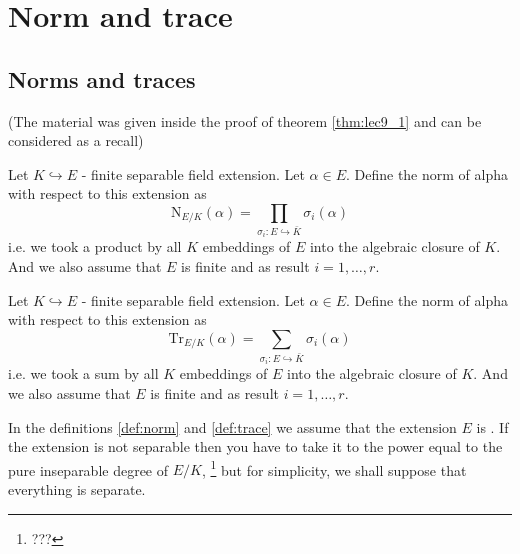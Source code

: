 \section{Norm and trace}

\subsection{Norms and traces}
(The material was given inside the proof of theorem \ref{thm:lec9_1}
and can be considered as a recall)
\begin{definition}[Norm]
  Let $K \hookrightarrow E$ - finite separable field extension. Let $\alpha \in
  E$.   Define the norm of alpha with respect to this extension as
  \[
  \mathrm {N}_{E/K}\left(\alpha\right) =
  \prod_{\sigma_i: E \hookrightarrow \bar{K}} \sigma_i\left(\alpha\right)
  \]
  i.e. we took a product by all $K$ embeddings of $E$ into the
  algebraic closure of $K$. And we also assume that $E$ is
  finite and as result $i = 1, \dots, r$.
  \label{def:norm}
\end{definition}

\begin{definition}[Trace]
  Let $K \hookrightarrow E$ - finite separable field extension. Let $\alpha \in
  E$.   Define the norm of alpha with respect to this extension as
  \[
  \mathrm {Tr}_{E/K}\left(\alpha\right) =
  \sum_{\sigma_i: E \hookrightarrow \bar{K}} \sigma_i\left(\alpha\right)
  \]
  i.e. we took a sum by all $K$ embeddings of $E$ into the
  algebraic closure of $K$. And we also assume that $E$ is
  finite and as result $i = 1, \dots, r$.
  \label{def:trace}
\end{definition}

In the definitions \ref{def:norm} and \ref{def:trace} we assume that
the extension $E$ is . If the
extension is not separable then you have to take it to the power
equal to the pure inseparable degree of $E/K$,
\footnote{
  ???
}
but for simplicity,
we shall suppose that everything is separate.

